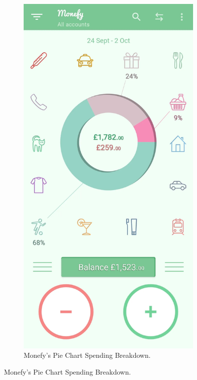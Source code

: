 \documentclass{l4proj}
\begin{document}
\begin{appendices}
\begin{figure}[h]
\begin{subfigure}[t]{0.25\textwidth}
        \includegraphics[width=\textwidth]{images/App-Comparison/monefy-ss-1.png}
        \caption{Monefy's Pie Chart Spending Breakdown.}
        \label{fig:syn1}
    \end{subfigure}

\end{figure}
\end{appendices}
\end{document}
